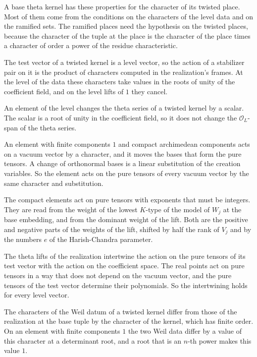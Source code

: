 A base theta kernel has these properties for the character of its twisted place. Most of them come from the
conditions on the characters of the level data and on the ramified sets. The ramified places need the
hypothesis on the twisted places, because the character of the tuple at the place is the character of the
place times a character of order a power of the residue characteristic.

The test vector of a twisted kernel is a level vector, so the action of a stabilizer pair on it is the
product of characters computed in the realization's frames. At the level of the data these characters
take values in the roots of unity of the coefficient field, and on the level lifts of $1$ they cancel.

An element of the level changes the theta series of a twisted kernel by a scalar. The scalar is a root of
unity in the coefficient field, so it does not change the $\mathcal O_L$-span of the theta series.

An element with finite components $1$ and compact archimedean components acts on a vacuum vector by a
character, and it moves the bases that form the pure tensors. A change of orthonormal bases is a linear
substitution of the creation variables. So the element acts on the pure tensors of every vacuum vector by
the same character and substitution.

The compact elements act on pure tensors with exponents that must be integers. They are read from the
weight of the lowest $K$-type of the model of $W_j$ at the base embedding, and from the dominant weight of
the lift. Both are the positive and negative parts of the weights of the lift, shifted by half the rank of
$V_j$ and by the numbers $e$ of the Harish-Chandra parameter.

The theta lifts of the realization intertwine the action on the pure tensors of its test vector with the
action on the coefficient space. The real points act on pure tensors in a way that does not depend on the
vacuum vector, and the pure tensors of the test vector determine their polynomials. So the intertwining
holds for every level vector.

The characters of the Weil datum of a twisted kernel differ from those of the realization at the base
tuple by the character of the kernel, which has finite order. On an element with finite components $1$ the
two Weil data differ by a value of this character at a determinant root, and a root that is an $n$-th power
makes this value $1$.

